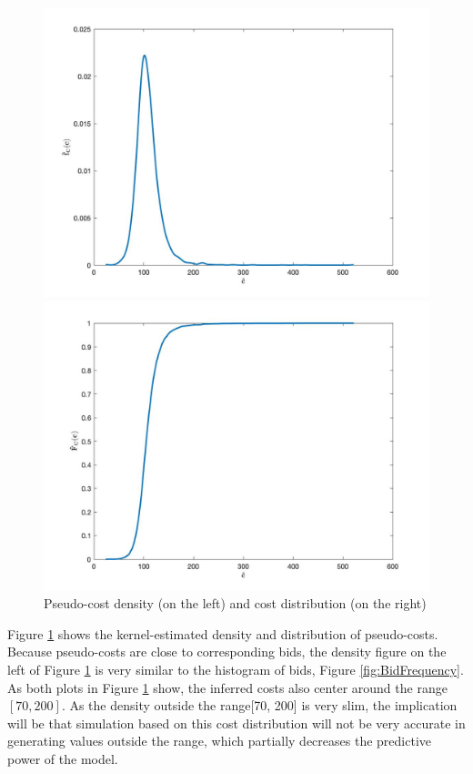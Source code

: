 \documentclass[11pt]{article}
\begin{document}
\begin{figure}
\centering
    \begin{minipage}[h]{0.5\textwidth}
        \centering
        \includegraphics[width=1\linewidth]{costDensity.jpg}
    \end{minipage}%
    \begin{minipage}[h]{0.5\textwidth}
        \centering
        \includegraphics[width=1\linewidth]{costDistribution.jpg}
    \end{minipage}
\caption{Pseudo-cost density (on the left) and cost distribution (on the right)}
\label{fig:CostEstimation}
\end{figure}

Figure \ref{fig:CostEstimation} shows the kernel-estimated density and 
distribution of pseudo-costs. Because pseudo-costs are close to corresponding 
bids, the density figure on the left of Figure \ref{fig:CostEstimation} is very 
similar to the histogram of bids, Figure \ref{fig:BidFrequency}. As both plots in 
Figure \ref{fig:CostEstimation} show, the inferred costs also center around 
the range $[70, 200]$. As the density outside the range[70, 200] is very slim, 
the implication will be that simulation based on this cost distribution will not 
be very accurate in generating values outside the range, which partially 
decreases the predictive power of the model. 
\end{document}

